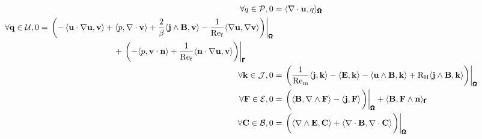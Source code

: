     \begin{align}
        \forall q \in \calP,  0  &=  \langle\nabla\cdot\bfu, q\rangle_{\bfOmega}  \\
        \begin{split}
            \forall \bfq \in \calU,  0  &=  \left.\left(- \left\langle\bfu\cdot\nabla\bfu, \bfv\right\rangle + \langle p, \nabla\cdot\bfv\rangle + \frac{2}{\beta}\langle\bfj\wedge\bfB, \bfv\rangle - \frac{1}{\rmRef}\langle\nabla\bfu, \nabla\bfv\rangle\right)\right|_{\bfOmega}  \\
            &\;\;\;\;\;\;\;\;\;\;\;\;\;\;\;\;\;\;\;\;\;\;\;\;\;\;\;\;\;\;\;\;  + \left.\left(- \langle p, \bfv\cdot\bfn\rangle + \frac{1}{\rmRef}\langle\bfn\cdot\nabla\bfu, \bfv\rangle\right)\right|_{\bfGamma}
        \end{split}  \\
        \forall \bfk \in \calJ,  0  &=  \left.\left(\frac{1}{\rmRem}\langle\bfj, \bfk\rangle - \langle\bfE, \bfk\rangle - \langle\bfu\wedge\bfB, \bfk\rangle + \rmRH\langle\bfj\wedge\bfB, \bfk\rangle\right)\right|_{\bfOmega}  \\
        \forall \bfF \in \calE,  0  &=  \left.\left(\langle\bfB, \nabla\wedge\bfF\rangle - \langle\bfj, \bfF\rangle\tall\right)\right|_{\bfOmega} + \langle\bfB, \bfF\wedge\bfn\rangle_{\bfGamma}  \\
        \forall \bfC \in \calB,  0  &=  \left.\left(\langle\nabla\wedge\bfE, \bfC\rangle + \langle\nabla\cdot\bfB, \nabla\cdot\bfC\rangle\tall\right)\right|_{\bfOmega}
    \end{align}
    
    \line

